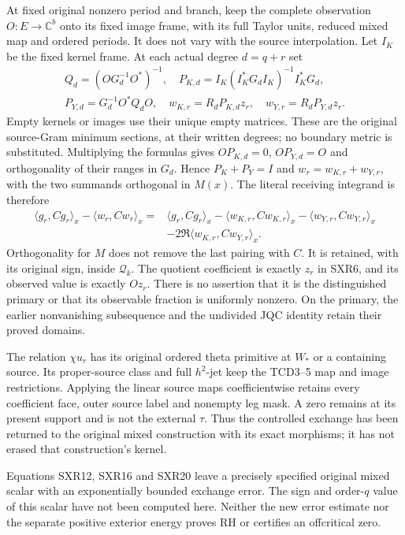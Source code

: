 At fixed original nonzero period and branch, keep the complete
observation $O:E\to\mathbb C^b$ onto its fixed image frame, with
its full Taylor units, reduced mixed map and ordered periods. It
does not vary with the source interpolation. Let $I_K$ be the fixed
kernel frame. At each actual degree $d=q+r$ set
\begin{equation}\tag{SXR19}
\begin{gathered}
 Q_d=(OG_d^{-1}O^*)^{-1},\quad
 P_{K,d}=I_K(I_K^*G_dI_K)^{-1}I_K^*G_d,\\
 P_{Y,d}=G_d^{-1}O^*Q_dO,\quad
 w_{K,r}=R_dP_{K,d}z_r,\quad w_{Y,r}=R_dP_{Y,d}z_r.
\end{gathered}
\end{equation}
Empty kernels or images use their unique empty matrices. These
are the original source-Gram minimum sections, at their written
degrees; no boundary metric is substituted. Multiplying the
formulas gives $OP_{K,d}=0$, $OP_{Y,d}=O$ and orthogonality of
their ranges in $G_d$. Hence $P_K+P_Y=I$ and
$w_r=w_{K,r}+w_{Y,r}$, with the two summands orthogonal in $M(x)$.
The literal receiving integrand is therefore
\begin{equation}\tag{SXR20}
\begin{aligned}
 \langle g_r,Cg_r\rangle_x-\langle w_r,Cw_r\rangle_x
 ={}&\langle g_r,Cg_r\rangle_x
   -\langle w_{K,r},Cw_{K,r}\rangle_x
   -\langle w_{Y,r},Cw_{Y,r}\rangle_x\\
 &-2\Re\langle w_{K,r},Cw_{Y,r}\rangle_x.
\end{aligned}
\end{equation}
Orthogonality for $M$ does not remove the last pairing with $C$.
It is retained, with its original sign, inside $\mathcal Q_k$.
The quotient coefficient is exactly $z_r$ in SXR6, and its observed
value is exactly $Oz_r$. There is no assertion that it is the
distinguished primary or that its observable fraction is uniformly
nonzero. On the primary, the earlier nonvanishing subsequence and
the undivided JQC identity retain their proved domains.

The relation $\chi u_r$ has its original ordered theta primitive
at $W_*$ or a containing source. Its proper-source class and full
$h^2$-jet keep the TCD3--5 map and image restrictions. Applying the
linear source maps coefficientwise retains every coefficient face,
outer source label and nonempty leg mask. A zero remains at its
present support and is not the external $\tau$. Thus the controlled
exchange has been returned to the original mixed construction with
its exact morphisms; it has not erased that construction's kernel.

Equations SXR12, SXR16 and SXR20 leave a precisely specified original
mixed scalar with an exponentially bounded exchange error. The sign
and order-$q$ value of this scalar have not been computed here.
Neither the new error estimate nor the separate positive exterior
energy proves RH or certifies an offcritical zero.
\endgroup